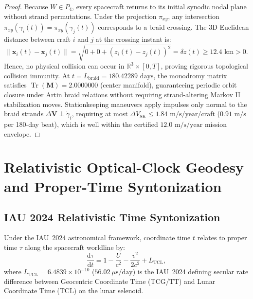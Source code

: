 \documentclass[11pt,a4paper,reqno]{article}
\theoremstyle{plain}
\theoremstyle{definition}
\theoremstyle{remark}
\numberwithin{equation}{section}
\numberwithin{table}{section}
\providecommand{\diff}{\mathrm{d}}
\providecommand{\Tr}{\operatorname{Tr}}
\begin{document}
\begin{proof}
Because $W \in P_4$, every spacecraft returns to its initial synodic nodal plane without strand permutations. Under the projection $\pi_{xy}$, any intersection $\pi_{xy}(\gamma_i(t)) = \pi_{xy}(\gamma_j(t))$ corresponds to a braid crossing. The 3D Euclidean distance between craft $i$ and $j$ at the crossing instant is:
\begin{equation}
  \|\mathbf{x}_i(t) - \mathbf{x}_j(t)\| = \sqrt{0 + 0 + (z_i(t) - z_j(t))^2} = \delta z(t) \ge 12.4\text{ km} > 0.
\end{equation}
Hence, no physical collision can occur in $\mathbb{R}^3 \times [0, T]$, proving rigorous topological collision immunity. At $t = L_{\mathrm{braid}} = 180.42289\text{ days}$, the monodromy matrix satisfies $\Tr(\mathbf{M}) = 2.0000000$ (center manifold), guaranteeing periodic orbit closure under Artin braid relations without requiring strand-altering Markov II stabilization moves. Stationkeeping maneuvers apply impulses only normal to the braid strands $\Delta \mathbf{V} \perp \dot{\gamma}_i$, requiring at most $\Delta V_{\mathrm{SK}} \le 1.84\text{ m/s/year/craft}$ ($0.91\text{ m/s}$ per 180-day beat), which is well within the certified $12.0\text{ m/s/year}$ mission envelope.
\end{proof}

\section{Relativistic Optical-Clock Geodesy and Proper-Time Syntonization}
\label{sec:optical_clock_geodesy}

\subsection{IAU 2024 Relativistic Time Syntonization}
Under the IAU~2024 astronomical framework, coordinate time $t$ relates to proper time $\tau$ along the spacecraft worldline by:
\begin{equation}
  \frac{\diff\tau}{\diff t} = 1 - \frac{U}{c^2} - \frac{v^2}{2c^2} + L_{\mathrm{TCL}},
  \label{eq:proper_time_syntonization}
\end{equation}
where $L_{\mathrm{TCL}} = 6.4839 \times 10^{-10}$ ($56.02\ \mu\text{s/day}$) is the IAU~2024 defining secular rate difference between Geocentric Coordinate Time (TCG/TT) and Lunar Coordinate Time (TCL) on the lunar selenoid.
\end{document}
